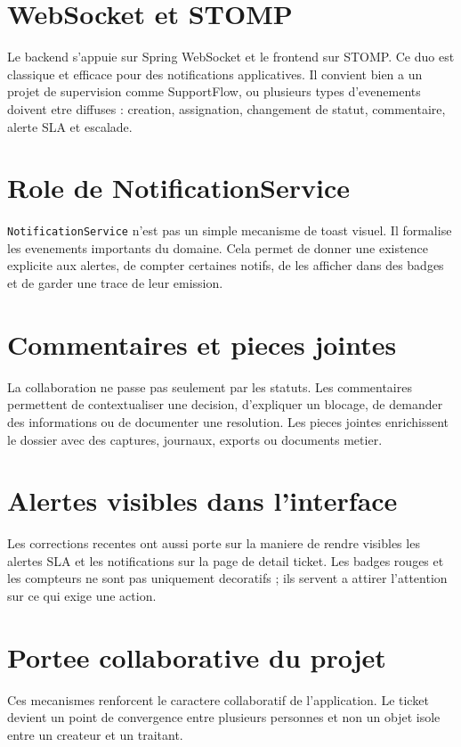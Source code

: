 \documentclass[12pt,a4paper,oneside]{report}
\begin{document}
\section{WebSocket et STOMP}

Le backend s'appuie sur Spring WebSocket et le frontend sur STOMP. Ce duo est classique et efficace pour des notifications applicatives. Il convient bien a un projet de supervision comme SupportFlow, ou plusieurs types d'evenements doivent etre diffuses : creation, assignation, changement de statut, commentaire, alerte SLA et escalade.

\section{Role de NotificationService}

\texttt{NotificationService} n'est pas un simple mecanisme de toast visuel. Il formalise les evenements importants du domaine. Cela permet de donner une existence explicite aux alertes, de compter certaines notifs, de les afficher dans des badges et de garder une trace de leur emission.

\section{Commentaires et pieces jointes}

La collaboration ne passe pas seulement par les statuts. Les commentaires permettent de contextualiser une decision, d'expliquer un blocage, de demander des informations ou de documenter une resolution. Les pieces jointes enrichissent le dossier avec des captures, journaux, exports ou documents metier.

\section{Alertes visibles dans l'interface}

Les corrections recentes ont aussi porte sur la maniere de rendre visibles les alertes SLA et les notifications sur la page de detail ticket. Les badges rouges et les compteurs ne sont pas uniquement decoratifs ; ils servent a attirer l'attention sur ce qui exige une action.

\section{Portee collaborative du projet}

Ces mecanismes renforcent le caractere collaboratif de l'application. Le ticket devient un point de convergence entre plusieurs personnes et non un objet isole entre un createur et un traitant.
\end{document}

